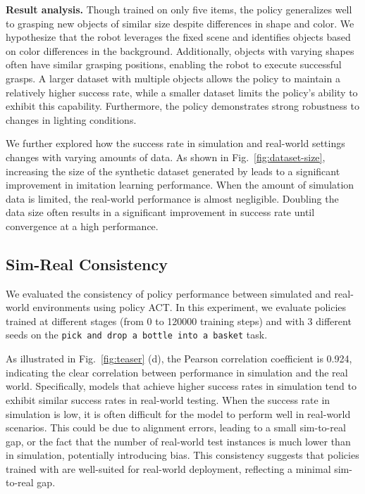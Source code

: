 \noindent\textbf{Result analysis.}
Though trained on only five items, the policy generalizes well to grasping new objects of similar size despite differences in shape and color. We hypothesize that the robot leverages the fixed scene and identifies objects based on color differences in the background. Additionally, objects with varying shapes often have similar grasping positions, enabling the robot to execute successful grasps. A larger dataset with multiple objects allows the policy to maintain a relatively higher success rate, while a smaller dataset limits the policy’s ability to exhibit this capability. Furthermore, the policy demonstrates strong robustness to changes in lighting conditions.

We further explored how the success rate in simulation and real-world settings changes with varying amounts of data. As shown in Fig.~\ref{fig:dataset-size}, increasing the size of the synthetic dataset generated by \our leads to a significant improvement in imitation learning performance. When the amount of simulation data is limited, the real-world performance is almost negligible. Doubling the data size often results in a significant improvement in success rate until convergence at a high performance. 

\subsection{Sim-Real Consistency}

We evaluated the consistency of policy performance between simulated and real-world environments using policy ACT. In this experiment, we evaluate policies trained at different stages (from 0 to 120000 training steps) and with 3 different seeds on the \texttt{pick and drop a bottle into a basket} task. 

As illustrated in Fig.~\ref{fig:teaser} (d), the Pearson correlation coefficient is 0.924, indicating the clear correlation between performance in simulation and the real world. Specifically, models that achieve higher success rates in simulation tend to exhibit similar success rates in real-world testing.
When the success rate in simulation is low, it is often difficult for the model to perform well in real-world scenarios. This could be due to alignment errors, leading to a small sim-to-real gap, or the fact that the number of real-world test instances is much lower than in simulation, potentially introducing bias.
This consistency suggests that policies trained with \our are well-suited for real-world deployment, reflecting a minimal sim-to-real gap.

